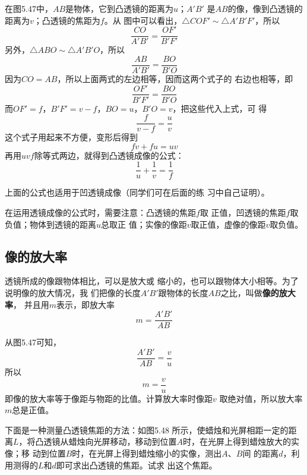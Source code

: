在图5.47中，$AB$是物体，它到凸透镜的距离为$u$；$A'B'$
是$AB$的像，像到凸透镜的距离为$v$；凸透镜的焦距为$f$。从
图中可以看出，$\triangle COF'  \sim   \triangle A'B'F'$，所以
\[\frac{CO}{A'B'}=\frac{OF'}{B'F'}  \]
另外，$\triangle ABO \sim \triangle A'B'O$，所以
\[\frac{AB}{A'B'}=\frac{BO}{B'O} \]
因为$CO=AB$，所以上面两式的左边相等，因而这两个式子的
右边也相等，即
\[\frac{OF'}{B'F'}=\frac{BO}{B'O} \]
而$OF'=f$，$B'F'=v-f$，$BO=u$，$B'O=v$，把这些代入上式，可
得
\[\frac{f}{v-f}=\frac{u}{v} \]
这个式子用起来不方便，变形后得到
\[fv+fu=uv \]
再用$uvf$除等式两边，就得到凸透镜成像的公式：
\[\frac{1}{u}+\frac{1}{v}=\frac{1}{f}  \]

上面的公式也适用于凹透镜成像（同学们可在后面的练
习中自己证明）。

在运用透镜成像的公式时，需要注意：凸透镜的焦距$f$取
正值，凹透镜的焦距$f$取负值；物体到透镜的距离$u$总取正
值；实像的像距$v$取正值，虚像的像距$v$取负值。

\subsection{像的放大率}

透镜所成的像跟物体相比，可以是放大或
缩小的，也可以跟物体大小相等。为了说明像的放大情况，我
们把像的长度$A'B'$跟物体的长度$AB$之比，叫做\textbf{像的放大率}，
并且用$m$表示，即放大率
\[m=\frac{A'B'}{AB} \]

从图5.47可知，
\[\frac{A'B'}{AB}=\frac{v}{u} \]
所以
\[m=\frac{v}{u}\]
即像的放大率等于像距与物距的比值。计算放大率时像距$v$
取绝对值，所以放大率$m$总是正值。

\begin{example}
    下面是一种测量凸透镜焦距的方法：如图5.48
所示，使蜡烛和光屏相距一定的距离$L$，将凸透镜从蜡烛向光屏移动，移动到位置$A$时，在光屏上得到蜡烛放大的实像；移
动到位置$B$时，在光屏上得到蜡烛缩小的实像，测出$A$、$B$间
的距离$d$，利用测得的$L$和$d$即可求出凸透镜的焦距。试求
出这个焦距。
\end{example}

\begin{figure}[htp]
	\centering
{}
	\caption{}
\end{figure}


